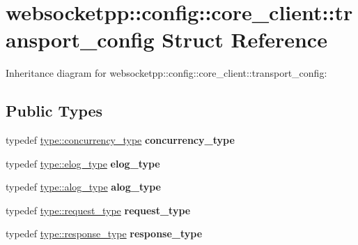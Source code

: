 \hypertarget{structwebsocketpp_1_1config_1_1core__client_1_1transport__config}{}\section{websocketpp\+:\+:config\+:\+:core\+\_\+client\+:\+:transport\+\_\+config Struct Reference}
\label{structwebsocketpp_1_1config_1_1core__client_1_1transport__config}


Inheritance diagram for websocketpp\+:\+:config\+:\+:core\+\_\+client\+:\+:transport\+\_\+config\+:
\subsection*{Public Types}
\begin{DoxyCompactItemize}
\item 
\mbox{\label{structwebsocketpp_1_1config_1_1core__client_1_1transport__config_a5389723cc4121177af00f6f32fe0f89d}} 
typedef \mbox{\hyperlink{classwebsocketpp_1_1concurrency_1_1basic}{type\+::concurrency\+\_\+type}} {\bfseries concurrency\+\_\+type}
\item 
\mbox{\label{structwebsocketpp_1_1config_1_1core__client_1_1transport__config_a898406c4885d089ecd5e384044645c84}} 
typedef \mbox{\hyperlink{structwebsocketpp_1_1config_1_1core__client_a24f1bae9e8a92bf7950153ed39eaffb8}{type\+::elog\+\_\+type}} {\bfseries elog\+\_\+type}
\item 
\mbox{\label{structwebsocketpp_1_1config_1_1core__client_1_1transport__config_aa41ba2c4801fadf51c399fd409118c61}} 
typedef \mbox{\hyperlink{classwebsocketpp_1_1log_1_1basic}{type\+::alog\+\_\+type}} {\bfseries alog\+\_\+type}
\item 
\mbox{\label{structwebsocketpp_1_1config_1_1core__client_1_1transport__config_a81d8b4e1d7bb8975731aa03690821fa4}} 
typedef \mbox{\hyperlink{classwebsocketpp_1_1http_1_1parser_1_1request}{type\+::request\+\_\+type}} {\bfseries request\+\_\+type}
\item 
\mbox{\label{structwebsocketpp_1_1config_1_1core__client_1_1transport__config_ae2a3007f9ac70a89ce353db54dda0ad8}} 
typedef \mbox{\hyperlink{classwebsocketpp_1_1http_1_1parser_1_1response}{type\+::response\+\_\+type}} {\bfseries response\+\_\+type}
\end{DoxyCompactItemize}
